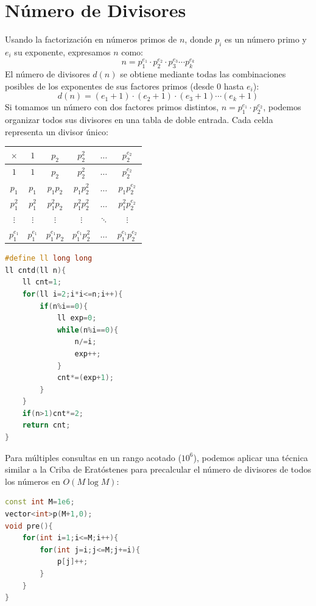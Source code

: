\documentclass{article}
\begin{document}
\section*{Número de Divisores}
Usando la factorización en números primos de $n$, donde $p_i$ es un número primo y $e_i$ su exponente, expresamos $n$ como:
\begin{equation}
    n = p_1^{e_1} \cdot p_2^{e_2} \cdot p_3^{e_3} \cdots p_k^{e_k}
\end{equation}
El número de divisores $d(n)$ se obtiene mediante todas las combinaciones posibles de los exponentes de sus factores primos (desde $0$ hasta $e_i$):
\begin{equation}
    d(n) = (e_1 + 1) \cdot (e_2 + 1) \cdot (e_3 + 1) \cdots (e_k + 1)
\end{equation}
Si tomamos un número con dos factores primos distintos, $n = p_1^{e_1} \cdot p_2^{e_2}$, podemos organizar todos sus divisores en una tabla de doble entrada. Cada celda representa un divisor único:
\begin{center}
\renewcommand{\arraystretch}{1.5}
\begin{tabular}{c|ccccc}
$\times$ & $1$ & $p_2$ & $p_2^2$ & $\dots$ & $p_2^{e_2}$ \\ \hline
$1$ & $1$ & $p_2$ & $p_2^2$ & $\dots$ & $p_2^{e_2}$ \\
$p_1$ & $p_1$ & $p_1 p_2$ & $p_1 p_2^2$ & $\dots$ & $p_1 p_2^{e_2}$ \\
$p_1^2$ & $p_1^2$ & $p_1^2 p_2$ & $p_1^2 p_2^2$ & $\dots$ & $p_1^2 p_2^{e_2}$ \\
$\vdots$ & $\vdots$ & $\vdots$ & $\vdots$ & $\ddots$ & $\vdots$ \\
$p_1^{e_1}$ & $p_1^{e_1}$ & $p_1^{e_1} p_2$ & $p_1^{e_1} p_2^2$ & $\dots$ & $p_1^{e_1} p_2^{e_2}$ \\
\end{tabular}
\end{center}
\begin{lstlisting}[language=C++]
#define ll long long
ll cntd(ll n){
    ll cnt=1;
    for(ll i=2;i*i<=n;i++){
        if(n%i==0){
            ll exp=0;
            while(n%i==0){
                n/=i;
                exp++;
            }
            cnt*=(exp+1);
        }
    }
    if(n>1)cnt*=2;
    return cnt;
}
\end{lstlisting}
Para múltiples consultas en un rango acotado ($10^6$), podemos aplicar una técnica similar a la Criba de Eratóstenes para precalcular el número de divisores de todos los números en $O(M \log M)$:
\begin{lstlisting}[language=C++]
const int M=1e6;
vector<int>p(M+1,0);
void pre(){
    for(int i=1;i<=M;i++){
        for(int j=i;j<=M;j+=i){
            p[j]++;
        }
    }
}
\end{lstlisting}
\end{document}
